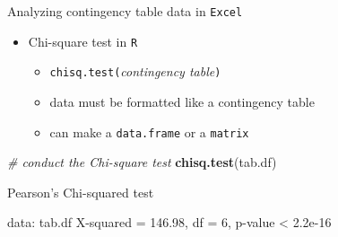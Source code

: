 \documentclass[
  ignorenonframetext,
  t]{beamer}
\newenvironment{Shaded}{\begin{snugshade}}{\end{snugshade}}
\newcommand{\CommentTok}[1]{\textcolor[rgb]{0.56,0.35,0.01}{\textit{#1}}}
\newcommand{\KeywordTok}[1]{\textcolor[rgb]{0.13,0.29,0.53}{\textbf{#1}}}
\newcommand{\NormalTok}[1]{#1}
\newcommand{\StringTok}[1]{\textcolor[rgb]{0.31,0.60,0.02}{#1}}
\providecommand{\tightlist}{%
  \setlength{\itemsep}{0pt}\setlength{\parskip}{0pt}}
\begin{document}
\begin{frame}[fragile]{Analyzing contingency table data in
\texttt{Excel}}
\protect\hypertarget{analyzing-contingency-table-data-in-5}{}

\begin{itemize}
\tightlist
\item
  Chi-square test in \texttt{R}

  \begin{itemize}
  \tightlist
  \item
    \texttt{chisq.test(}\emph{contingency table}\texttt{)}
  \item
    data must be formatted like a contingency table
  \item
    can make a \texttt{data.frame} or a \texttt{matrix}
  \end{itemize}
\end{itemize}

\scriptsize

\begin{Shaded}
\begin{Highlighting}[]
\CommentTok{# conduct the Chi-square test}
\KeywordTok{chisq.test}\NormalTok{(tab.df)}

\NormalTok{    Pearson}\StringTok{'s Chi-squared test}

\StringTok{data:  tab.df}
\StringTok{X-squared = 146.98, df = 6, p-value < 2.2e-16}
\end{Highlighting}
\end{Shaded}

\end{frame}
\end{document}
